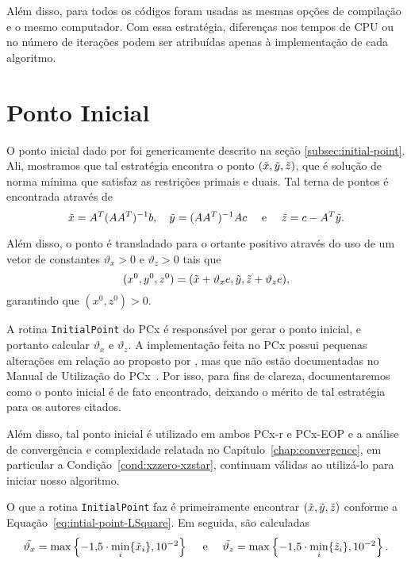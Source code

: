 Além disso, para todos os códigos foram usadas as mesmas opções de compilação e o mesmo computador. Com essa estratégia, diferenças nos tempos de CPU ou no número de iterações podem ser atribuídas apenas à implementação de cada algoritmo. 






\section{Ponto Inicial}
\label{sec:initial:point}
O ponto inicial dado por \textcite{Mehrotra:1992wr} foi genericamente descrito na seção \ref{subsec:initial-point}. Ali, mostramos que tal estratégia encontra o ponto $(\tilde{x},\tilde{y},\tilde{z})$, que é solução de norma mínima que satisfaz as restrições primais e
duais. Tal terna de pontos é encontrada através de
\begin{equation}
	\label{eq:intial-point-LSquare}
	\tilde{x} = A^T(AA^T)^{-1}b, \quad \tilde{y} = (AA^T)^{-1}Ac\quad \text{ e }
\quad \tilde{z} = c - A^T\tilde{y}.
\end{equation}

Além disso, o ponto é transladado para o ortante positivo 
através do uso de um vetor de constantes  $\vartheta_x>0$ e $\vartheta_ z>0$ tais que  
\begin{equation}
	\label{eq:intial-point-generated}
(x^0,y^0,z^0) = (\tilde{x}+ \vartheta_x e,\tilde{y},\tilde{z}+\vartheta_z e),
\end{equation}
garantindo que $(x^0,z^0)>0$.


 A rotina \verb|InitialPoint| do PCx é responsável por gerar o ponto inicial, e portanto calcular  $\vartheta_x$ e $\vartheta_ z$. A implementação feita no PCx possui  pequenas alterações em relação ao proposto por \citeauthor{Mehrotra:1992wr}, mas que não  estão documentadas no Manual de Utilização do PCx~\cite{Czyzyk:1998vw}. Por isso, para fins de clareza, documentaremos como o ponto inicial é de fato encontrado, deixando o mérito de tal estratégia para os autores citados.

  Além disso, tal ponto inicial é utilizado em ambos PCx-r e PCx-EOP e a análise de convergência e complexidade relatada no Capítulo~\ref{chap:convergence}, em particular a Condição~\ref{cond:xzzero-xzstar}, continuam válidas ao utilizá-lo para iniciar nosso algoritmo.

O que a rotina  \verb|InitialPoint| faz é primeiramente encontrar  $(\tilde{x},\tilde{y},\tilde{z})$ conforme a Equação~\eqref{eq:intial-point-LSquare}. Em seguida,  são calculadas
\begin{equation}
	\label{eq:initial-point-tilde-var}
\tilde{\vartheta_x} = \max\left\{\displaystyle\num{-1.5}\cdot\min_{i}\{\tilde{x}_{i}\},\num{e-2}\right\} \quad \text{ e }\quad  \tilde{\vartheta_z} = \max\left\{\displaystyle\num{-1.5}\cdot\min_{i}\{\tilde{z}_{i}\},\num{e-2}\right\}.
\end{equation}

